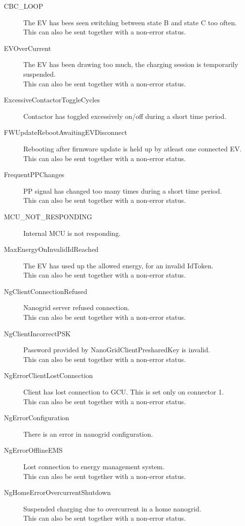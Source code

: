 \begin{description}

\item[CBC\_LOOP] The EV has bees seen switching between state B and state C too often.\\This can also be sent together with a non-error status.
\item[EVOverCurrent] The EV has been drawing too much, the charging session is temporarily suspended.\\This can also be sent together with a non-error status.
\item[ExcessiveContactorToggleCycles] Contactor has toggled excessively on/off during a short time period.
\item[FWUpdateRebootAwaitingEVDisconnect] Rebooting after firmware update is held up by atleast one connected EV.\\This can also be sent together with a non-error status.
\item[FrequentPPChanges] PP signal has changed too many times during a short time period.\\This can also be sent together with a non-error status.
\item[MCU\_NOT\_RESPONDING] Internal MCU is not responding.
\item[MaxEnergyOnInvalidIdReached] The EV has used up the allowed energy, for an invalid IdToken.\\This can also be sent together with a non-error status.
\item[NgClientConnectionRefused] Nanogrid server refused connection.\\This can also be sent together with a non-error status.
\item[NgClientIncorrectPSK] Password provided by NanoGridClientPresharedKey is invalid.\\This can also be sent together with a non-error status.
\item[NgErrorClientLostConnection] Client has lost connection to GCU. This is set only on connector 1.\\This can also be sent together with a non-error status.
\item[NgErrorConfiguration] There is an error in nanogrid configuration.
\item[NgErrorOfflineEMS] Lost connection to energy management system.\\This can also be sent together with a non-error status.
\item[NgHomeErrorOvercurrentShutdown] Suspended charging due to overcurrent in a home nanogrid.\\This can also be sent together with a non-error status.

\end{description}
